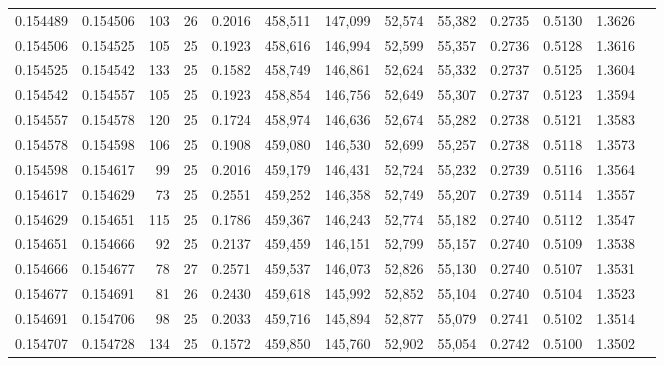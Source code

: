 \begin{tabular}{rrrrrrrrrrrrr}
0.154489 & 0.154506 &   103 &  26 &                                     0.2016 & 458,511 & 147,099 &  52,574 &  55,382 & 0.2735 & 0.5130 & 1.3626 \\
0.154506 & 0.154525 &   105 &  25 &                                     0.1923 & 458,616 & 146,994 &  52,599 &  55,357 & 0.2736 & 0.5128 & 1.3616 \\
0.154525 & 0.154542 &   133 &  25 &                                     0.1582 & 458,749 & 146,861 &  52,624 &  55,332 & 0.2737 & 0.5125 & 1.3604 \\
0.154542 & 0.154557 &   105 &  25 &                                     0.1923 & 458,854 & 146,756 &  52,649 &  55,307 & 0.2737 & 0.5123 & 1.3594 \\
0.154557 & 0.154578 &   120 &  25 &                                     0.1724 & 458,974 & 146,636 &  52,674 &  55,282 & 0.2738 & 0.5121 & 1.3583 \\
0.154578 & 0.154598 &   106 &  25 &                                     0.1908 & 459,080 & 146,530 &  52,699 &  55,257 & 0.2738 & 0.5118 & 1.3573 \\
0.154598 & 0.154617 &    99 &  25 &                                     0.2016 & 459,179 & 146,431 &  52,724 &  55,232 & 0.2739 & 0.5116 & 1.3564 \\
0.154617 & 0.154629 &    73 &  25 &                                     0.2551 & 459,252 & 146,358 &  52,749 &  55,207 & 0.2739 & 0.5114 & 1.3557 \\
0.154629 & 0.154651 &   115 &  25 &                                     0.1786 & 459,367 & 146,243 &  52,774 &  55,182 & 0.2740 & 0.5112 & 1.3547 \\
0.154651 & 0.154666 &    92 &  25 &                                     0.2137 & 459,459 & 146,151 &  52,799 &  55,157 & 0.2740 & 0.5109 & 1.3538 \\
0.154666 & 0.154677 &    78 &  27 &                                     0.2571 & 459,537 & 146,073 &  52,826 &  55,130 & 0.2740 & 0.5107 & 1.3531 \\
0.154677 & 0.154691 &    81 &  26 &                                     0.2430 & 459,618 & 145,992 &  52,852 &  55,104 & 0.2740 & 0.5104 & 1.3523 \\
0.154691 & 0.154706 &    98 &  25 &                                     0.2033 & 459,716 & 145,894 &  52,877 &  55,079 & 0.2741 & 0.5102 & 1.3514 \\
0.154707 & 0.154728 &   134 &  25 &                                     0.1572 & 459,850 & 145,760 &  52,902 &  55,054 & 0.2742 & 0.5100 & 1.3502 \\

\end{tabular}
